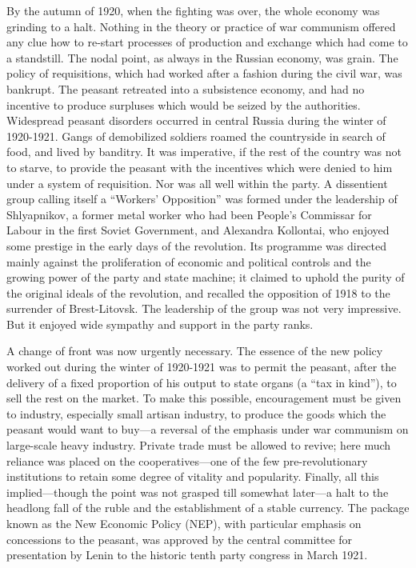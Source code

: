 By the autumn of 1920, when the fighting was over, the whole economy was grinding to a halt. Nothing in the theory or practice of war communism offered any clue how to re-start processes of production and exchange which had come to a standstill. The nodal point, as always in the Russian economy, was grain. The policy of requisitions, which had worked after a fashion during the civil war, was bankrupt. The peasant retreated into a subsistence economy, and had no incentive to produce surpluses which would be seized by the authorities. Widespread peasant disorders occurred in central Russia during the winter of 1920-1921. Gangs of demobilized soldiers roamed the countryside in search of food, and lived by banditry. It was imperative, if the rest of the country was not to starve, to provide the peasant with the incentives which were denied to him under a system of requisition. Nor was all well within the party. A dissentient group calling itself a ``Workers' Opposition'' was formed under the leadership of Shlyapnikov, a former metal worker who had been People's Commissar for Labour in the first Soviet Government, and Alexandra Kollontai, who enjoyed some prestige in the early days of the revolution. Its programme was directed mainly against the proliferation of economic and political controls and the growing power of the party and state machine; it claimed to uphold the purity of the original ideals of the revolution, and recalled the opposition of 1918 to the surrender of Brest-Litovsk. The leadership of the group was not very impressive. But it enjoyed wide sympathy and support in the party ranks. 

A change of front was now urgently necessary. The essence of the new policy worked out during the winter of 1920-1921 was to permit the peasant, after the delivery of a fixed proportion of his output to state organs (a ``tax in kind''), to sell the rest on the market. To make this possible, encouragement must be given to industry, especially small artisan industry, to produce the goods which the peasant would want to buy---a reversal of the emphasis under war communism on large-scale heavy industry. Private trade must be allowed to revive; here much reliance was placed on the cooperatives---one of the few pre-revolutionary institutions to retain some degree of vitality and popularity. Finally, all this implied---though the point was not grasped till somewhat later---a halt to the headlong fall of the ruble and the establishment of a stable currency. The package known as the New Economic Policy (NEP), with particular emphasis on concessions to the peasant, was approved by the central committee for presentation by Lenin to the historic tenth party congress in March 1921. 

